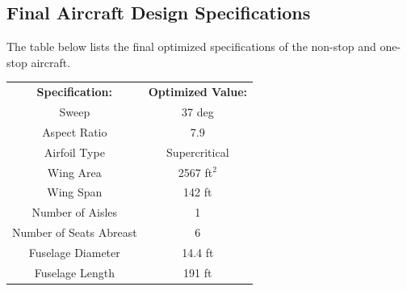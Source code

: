\documentclass{article}
\begin{document}
    \subsection{Final Aircraft Design Specifications}
    \label{sec:optimized}

        \begin{flushleft}
            The table below lists the final optimized specifications of the
            non-stop and one-stop aircraft.
        \end{flushleft}

        \begin{table}[ht]
            \begin{tabular}{|c|c|}
                \hline
                \rowcolor[HTML]{FFC702}
                \multicolumn{2}{|c|}{\cellcolor[HTML]{FFC702}\textbf{Non-stop Aircraft}} \\ \hline
                \textbf{Specification:}            & \textbf{Optimized Value:}           \\ \hline
                Sweep                              & 37 deg                              \\ \hline
                \rowcolor[HTML]{C0C0C0}
                Aspect Ratio                       & 7.9                                 \\ \hline
                \rowcolor[HTML]{FFFFFF}
                Airfoil Type                       & Supercritical                       \\ \hline
                \rowcolor[HTML]{C0C0C0}
                Wing Area                          & 2567 ft$^2$                             \\ \hline
                \rowcolor[HTML]{FFFFFF}
                Wing Span                          & 142 ft                              \\ \hline
                \rowcolor[HTML]{C0C0C0}
                Number of Aisles                   & 1                                   \\ \hline
                \rowcolor[HTML]{FFFFFF}
                Number of Seats Abreast            & 6                                   \\ \hline
                \rowcolor[HTML]{C0C0C0}
                Fuselage Diameter                  & 14.4 ft                             \\ \hline
                \rowcolor[HTML]{FFFFFF}
                Fuselage Length                    & 191 ft                              \\ \hline

\end{tabular}
\end{table}
\end{document}
